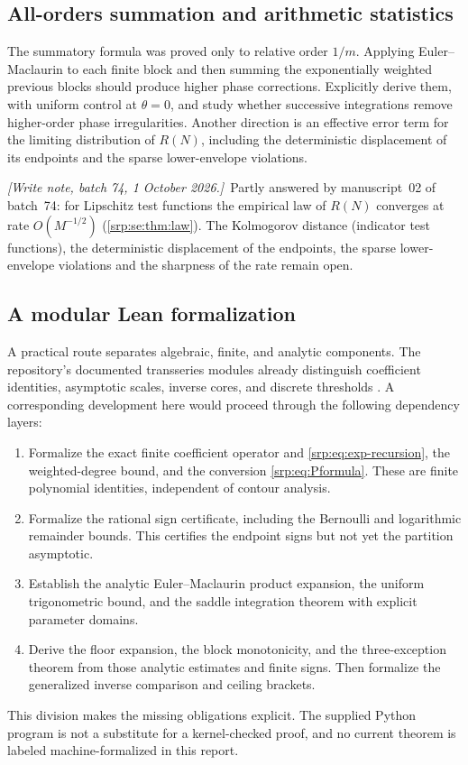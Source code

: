 \documentclass[11pt,a4paper]{article}
\numberwithin{equation}{section}
\theoremstyle{definition}
\theoremstyle{remark}
\newcommand{\writenotefour}[1]{\par\smallskip\noindent
 \textit{[Write note, batch 74, 1 October 2026.]}\ #1\par\smallskip}
\begin{document}
\subsection{All-orders summation and arithmetic statistics}
The summatory formula was proved only to relative order $1/m$. Applying
Euler--Maclaurin to each finite block and then summing the exponentially
weighted previous blocks should produce higher phase corrections.
Explicitly derive them, with uniform control at $\theta=0$, and study
whether successive integrations remove higher-order phase
irregularities. Another direction is an effective error term for the
limiting distribution of $R(N)$, including the deterministic displacement
of its endpoints and the sparse lower-envelope violations.

\writenotefour{Partly answered by manuscript~02 of batch~74: for Lipschitz
test functions the empirical law of $R(N)$ converges at rate
$O(M^{-1/2})$ (\cref{srp:se:thm:law}). The Kolmogorov distance (indicator
test functions), the deterministic displacement of the endpoints, the
sparse lower-envelope violations and the sharpness of the rate remain
open.}

\subsection{A modular Lean formalization}
A practical route separates algebraic, finite, and analytic components.
The repository's documented transseries modules already distinguish
coefficient identities, asymptotic scales, inverse cores, and discrete
thresholds \cite{proveit}. A corresponding development here would
proceed through the following dependency layers:
\begin{enumerate}[leftmargin=2em,itemsep=3pt]
\item Formalize the exact finite coefficient operator and
\eqref{srp:eq:exp-recursion}, the weighted-degree bound, and the conversion
\eqref{srp:eq:Pformula}. These are finite polynomial identities, independent
of contour analysis.
\item Formalize the rational sign certificate, including the Bernoulli
and logarithmic remainder bounds. This certifies the endpoint signs but
not yet the partition asymptotic.
\item Establish the analytic Euler--Maclaurin product expansion, the
uniform trigonometric bound, and the saddle integration theorem with
explicit parameter domains.
\item Derive the floor expansion, the block monotonicity, and the
three-exception theorem from those analytic estimates and finite signs.
Then formalize the generalized inverse comparison and ceiling brackets.
\end{enumerate}
This division makes the missing obligations explicit. The supplied
Python program is not a substitute for a kernel-checked proof, and no
current theorem is labeled machine-formalized in this report.
\end{document}
